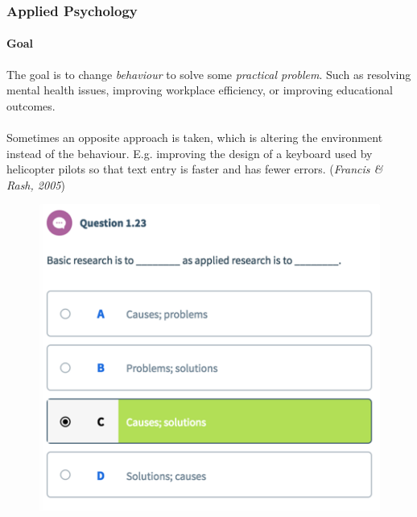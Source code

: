 \documentclass{article}
\begin{document}
 	\subsubsection{Applied Psychology}
 	\paragraph{Goal} The goal is to change \emph{behaviour} to solve some \emph{practical problem}.
 	\newline Such as resolving mental health issues, improving workplace efficiency, or improving educational outcomes.
 	\paragraph{} Sometimes an opposite approach is taken, which is altering the environment instead of the behaviour. E.g. improving the design of a keyboard used by helicopter pilots so that text entry is faster and has fewer errors. (\emph{Francis \& Rash, 2005})
 	\begin{figure}[H]
 		\centering
 		\includegraphics{psy100/0123}
 	\end{figure}
\end{document}
